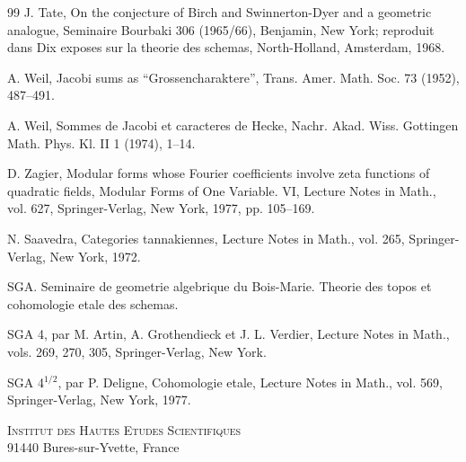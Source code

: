 \documentclass[12pt,a4paper]{article}
\theoremstyle{plain}
\theoremstyle{definition}
\theoremstyle{remark}
\begin{document}
\begin{thebibliography}{99}
J. Tate, On the conjecture of Birch and Swinnerton-Dyer and a geometric analogue, Seminaire
Bourbaki 306 (1965/66), Benjamin, New York; reproduit dans Dix exposes sur la theorie des
schemas, North-Holland, Amsterdam, 1968.

A. Weil, Jacobi sums as ``Grossencharaktere'', Trans. Amer. Math. Soc. 73 (1952), 487--491.

A. Weil, Sommes de Jacobi et caracteres de Hecke, Nachr. Akad. Wiss. Gottingen Math.
Phys. Kl. II 1 (1974), 1--14.

D. Zagier, Modular forms whose Fourier coefficients involve zeta functions of quadratic fields,
Modular Forms of One Variable. VI, Lecture Notes in Math., vol. 627, Springer-Verlag, New
York, 1977, pp. 105--169.

N. Saavedra, Categories tannakiennes, Lecture Notes in Math., vol. 265, Springer-Verlag,
New York, 1972.
\end{thebibliography}

\vspace{1em}
\noindent
SGA. Seminaire de geometrie algebrique du Bois-Marie. Theorie des topos et
cohomologie etale des schemas.

\noindent
SGA 4, par M. Artin, A. Grothendieck et J. L. Verdier, Lecture Notes in Math.,
vols. 269, 270, 305, Springer-Verlag, New York.

\noindent
SGA 4$^{1/2}$, par P. Deligne, Cohomologie etale, Lecture Notes in Math., vol. 569,
Springer-Verlag, New York, 1977.

\vspace{2em}
\begin{flushright}
\textsc{Institut des Hautes Etudes Scientifiques}\\
91440 Bures-sur-Yvette, France
\end{flushright}
\end{document}
